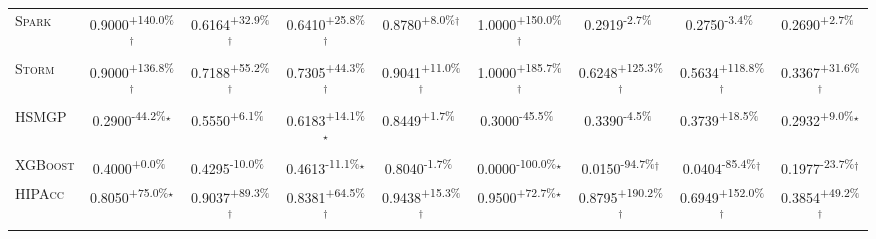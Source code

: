 \begin{table}[htbp]
\begin{tabular}{l|cccc|cccc}
\textsc{Spark} & \cellcolor{green!30}0.9000\textsuperscript{+140.0\%}$^\dagger$ & \cellcolor{green!30}0.6164\textsuperscript{+32.9\%}$^\dagger$ & \cellcolor{green!30}0.6410\textsuperscript{+25.8\%}$^\dagger$ & \cellcolor{green!30}0.8780\textsuperscript{+8.0\%}$^\dagger$ & \cellcolor{green!30}1.0000\textsuperscript{+150.0\%}$^\dagger$ & \cellcolor{red!30}0.2919\textsuperscript{-2.7\%}$^{\,\,\,}$ & \cellcolor{red!30}0.2750\textsuperscript{-3.4\%}$^{\,\,\,}$ & \cellcolor{green!30}0.2690\textsuperscript{+2.7\%}$^{\,\,\,}$ \\
\textsc{Storm} & \cellcolor{green!30}0.9000\textsuperscript{+136.8\%}$^\dagger$ & \cellcolor{green!30}0.7188\textsuperscript{+55.2\%}$^\dagger$ & \cellcolor{green!30}0.7305\textsuperscript{+44.3\%}$^\dagger$ & \cellcolor{green!30}0.9041\textsuperscript{+11.0\%}$^\dagger$ & \cellcolor{green!30}1.0000\textsuperscript{+185.7\%}$^\dagger$ & \cellcolor{green!30}0.6248\textsuperscript{+125.3\%}$^\dagger$ & \cellcolor{green!30}0.5634\textsuperscript{+118.8\%}$^\dagger$ & \cellcolor{green!30}0.3367\textsuperscript{+31.6\%}$^\dagger$ \\
\textsc{HSMGP} & \cellcolor{red!30}0.2900\textsuperscript{-44.2\%}$^\star$ & \cellcolor{green!30}0.5550\textsuperscript{+6.1\%}$^{\,\,\,}$ & \cellcolor{green!30}0.6183\textsuperscript{+14.1\%}$^\star$ & \cellcolor{green!30}0.8449\textsuperscript{+1.7\%}$^{\,\,\,}$ & \cellcolor{red!30}0.3000\textsuperscript{-45.5\%}$^{\,\,\,}$ & \cellcolor{red!30}0.3390\textsuperscript{-4.5\%}$^{\,\,\,}$ & \cellcolor{green!30}0.3739\textsuperscript{+18.5\%}$^{\,\,\,}$ & \cellcolor{green!30}0.2932\textsuperscript{+9.0\%}$^\star$ \\
\textsc{XGBoost} & \cellcolor{green!30}0.4000\textsuperscript{+0.0\%}$^{\,\,\,}$ & \cellcolor{red!30}0.4295\textsuperscript{-10.0\%}$^{\,\,\,}$ & \cellcolor{red!30}0.4613\textsuperscript{-11.1\%}$^\star$ & \cellcolor{red!30}0.8040\textsuperscript{-1.7\%}$^{\,\,\,}$ & \cellcolor{red!30}0.0000\textsuperscript{-100.0\%}$^\star$ & \cellcolor{red!30}0.0150\textsuperscript{-94.7\%}$^\dagger$ & \cellcolor{red!30}0.0404\textsuperscript{-85.4\%}$^\dagger$ & \cellcolor{red!30}0.1977\textsuperscript{-23.7\%}$^\dagger$ \\
\textsc{HIPAcc} & \cellcolor{green!30}0.8050\textsuperscript{+75.0\%}$^\star$ & \cellcolor{green!30}0.9037\textsuperscript{+89.3\%}$^\dagger$ & \cellcolor{green!30}0.8381\textsuperscript{+64.5\%}$^\dagger$ & \cellcolor{green!30}0.9438\textsuperscript{+15.3\%}$^\dagger$ & \cellcolor{green!30}0.9500\textsuperscript{+72.7\%}$^\star$ & \cellcolor{green!30}0.8795\textsuperscript{+190.2\%}$^\dagger$ & \cellcolor{green!30}0.6949\textsuperscript{+152.0\%}$^\dagger$ & \cellcolor{green!30}0.3854\textsuperscript{+49.2\%}$^\dagger$ \\

\end{tabular}
\end{table}
